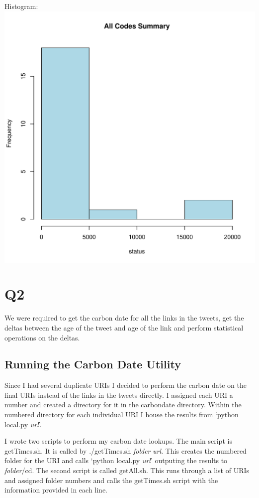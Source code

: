 \documentclass[12pt]{report}
\begin{document}
Histogram:\\
\includegraphics{statusCodesPlot.pdf}

\section*{Q2}

We were required to get the carbon date for all the links in the tweets, get the deltas between the age of the tweet and age of the link and perform statistical operations on the deltas.

\subsection*{Running the Carbon Date Utility}

Since I had several duplicate URIs I decided to perform the carbon date on the final URIs instead of the links in the tweets directly.  I assigned each URI a number and created a directory for it in the carbondate directory.  Within the numbered directory for each individual URI I house the results from `python local.py \textit{url}'.

I wrote two scripts to perform my carbon date lookups.  The main script is getTimes.sh.  It is called by ./getTimes.sh \textit{folder} \textit{url}.  This creates the numbered folder for the URI and calls `python local.py \textit{url}' outputing the results to \textit{folder}/cd.  The second script is called getAll.sh.  This runs through a list of URIs and assigned folder numbers and calls the getTimes.sh script with the information provided in each line.
\end{document}
